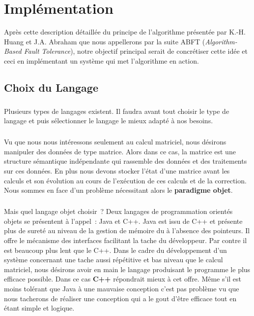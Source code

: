 \documentclass[a4paper,10pt]{report}
\begin{document}
\chapter{Implémentation}
Après cette description détaillée du principe de l’algorithme présentée par K.-H. Huang et J.A. Abraham que nous 
appellerons par la suite ABFT (\textit{Algorithm-Based Fault Tolerance}), notre objectif principal serait de 
concrétiser cette idée et ceci en implémentant un système qui met l’algorithme en action.
\section{Choix du Langage}
\paragraph*{}
Plusieurs types de langages existent. Il faudra avant tout choisir le type de langage et puis sélectionner le langage 
le mieux adapté à nos besoins.
\paragraph*{}
Vu que nous nous intéressons seulement au calcul matriciel, nous désirons manipuler des données de type matrice. 
Alors dans ce cas, la matrice est une structure sémantique indépendante qui rassemble des données et des traitements 
sur ces données. En plus nous devons stocker l’état d’une matrice avant les calculs et son évolution au cours de 
l’exécution de ces calculs et de la correction. Nous sommes en face d’un problème nécessitant alors le \textbf{paradigme objet}.
\paragraph*{}
Mais quel langage objet choisir ? Deux langages de programmation orientés objets se présentent à l’appel : Java et C++. 
Java est issu de C++ et présente plus de sureté au niveau de la gestion de mémoire du à l’absence des pointeurs. 
Il offre le mécanisme des interfaces facilitant la tache du développeur. Par contre il est beaucoup plus lent que le C++. 
Dans le cadre du développement d’un système concernant une tache aussi répétitive et bas niveau que le calcul matriciel, 
nous désirons avoir en main le langage produisant le programme le plus efficace possible. Dans ce cas \textbf{C++} répondrait mieux 
à cet offre. Même s’il est moins tolérant que Java à une mauvaise conception c'est pas problème vu que nous tacherons de réaliser 
une conception qui a le gout d’être efficace tout en étant simple et logique.
\end{document}
